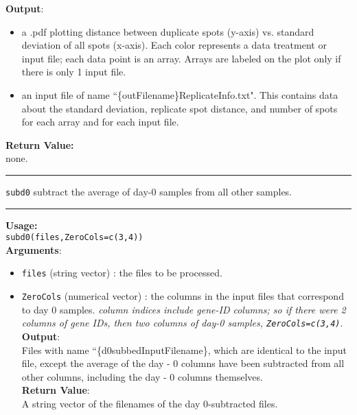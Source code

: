 \documentclass[10pt]{article}
\newcommand{\fquote}{``}
\begin{document}
\textbf{Output}: \begin{itemize}
\item a .pdf plotting distance between duplicate spots (y-axis) vs. standard deviation of all spots (x-axis). Each color represents a data treatment or input file; each data point is an array. Arrays are labeled on the plot only if there is only 1 input file.
\item an input file of name \fquote \{outFilename\}\textunderscore ReplicateInfo.txt". This contains data about the standard deviation, replicate spot distance, and  number of spots for each array and for each input file.
\end{itemize}
  \textbf{Return Value:}\\ 
none.\\
  \rule{\linewidth}{0.4pt}
  \texttt{subd0} \hspace{.6in} subtract the average of day-0 samples from all other samples.\\
    \rule{\linewidth}{0.4pt}
\textbf{Usage:}\\
\texttt{subd0(files,ZeroCols=c(3,4))}\\
\textbf{Arguments}:
\begin{itemize}
\item \texttt{files} (string vector) : the files to be processed.
\item \texttt{ZeroCols} (numerical vector) : the columns in the input files that correspond to day 0 samples. \emph{column indices include gene-ID columns; so if there were 2 columns of gene IDs, then two columns of day-0 samples, \texttt{ZeroCols=c(3,4)}}.\\
\textbf{Output}:\\
Files with name \fquote \{d0subbed\textunderscore InputFilename\}, which are identical to the input file, except the average of the day - 0 columns have been subtracted from all other columns, including the day - 0 columns themselves.\\
\textbf{Return Value}:\\
A string vector of the filenames of the day 0-subtracted files.
\end{itemize}
  
\end{document}
